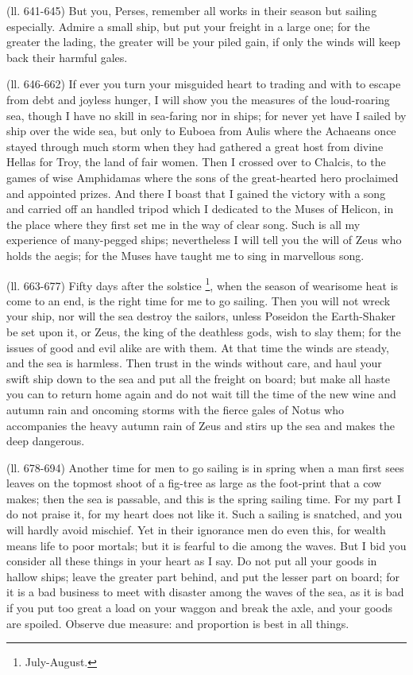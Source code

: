 (ll. 641-645) But you, Perses, remember all works in their season but sailing
especially. Admire a small ship, but put your freight in a large one; for the
greater the lading, the greater will be your piled gain, if only the winds will
keep back their harmful gales.

(ll. 646-662) If ever you turn your misguided heart to trading and with to
escape from debt and joyless hunger, I will show you the measures of the
loud-roaring sea, though I have no skill in sea-faring nor in ships; for never
yet have I sailed by ship over the wide sea, but only to Euboea from Aulis
where the Achaeans once stayed through much storm when they had gathered a
great host from divine Hellas for Troy, the land of fair women. Then I crossed
over to Chalcis, to the games of wise Amphidamas where the sons of the
great-hearted hero proclaimed and appointed prizes. And there I boast that I
gained the victory with a song and carried off an handled tripod which I
dedicated to the Muses of Helicon, in the place where they first set me in the
way of clear song. Such is all my experience of many-pegged ships; nevertheless
I will tell you the will of Zeus who holds the aegis; for the Muses have taught
me to sing in marvellous song.

(ll. 663-677) Fifty days after the solstice \footnote{July-August.}, when the
season of wearisome heat is come to an end, is the right time for me to go
sailing. Then you will not wreck your ship, nor will the sea destroy the
sailors, unless Poseidon the Earth-Shaker be set upon it, or Zeus, the king of
the deathless gods, wish to slay them; for the issues of good and evil alike
are with them. At that time the winds are steady, and the sea is harmless. Then
trust in the winds without care, and haul your swift ship down to the sea and
put all the freight on board; but make all haste you can to return home again
and do not wait till the time of the new wine and autumn rain and oncoming
storms with the fierce gales of Notus who accompanies the heavy autumn rain of
Zeus and stirs up the sea and makes the deep dangerous.

(ll. 678-694) Another time for men to go sailing is in spring when a man first
sees leaves on the topmost shoot of a fig-tree as large as the foot-print that
a cow makes; then the sea is passable, and this is the spring sailing time. For
my part I do not praise it, for my heart does not like it. Such a sailing is
snatched, and you will hardly avoid mischief. Yet in their ignorance men do
even this, for wealth means life to poor mortals; but it is fearful to die
among the waves. But I bid you consider all these things in your heart as I
say. Do not put all your goods in hallow ships; leave the greater part behind,
and put the lesser part on board; for it is a bad business to meet with
disaster among the waves of the sea, as it is bad if you put too great a load
on your waggon and break the axle, and your goods are spoiled. Observe due
measure: and proportion is best in all things.

